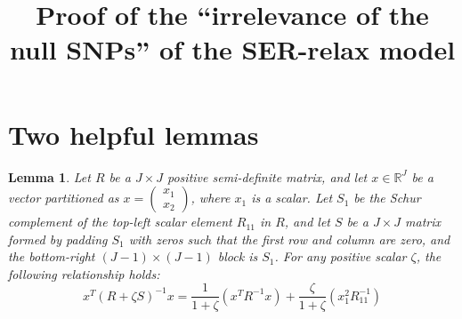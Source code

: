 \documentclass[11pt]{article}
\title{Proof of the ``irrelevance of the null SNPs'' of the SER-relax model}
\author{}
\date{}
\newtheorem{lemma}{Lemma}
\begin{document}
\maketitle

\section{Two helpful lemmas}

\begin{lemma}
Let $R$ be a $J \times J$ positive semi-definite matrix, and let $x \in \mathbb{R}^J$ be a vector partitioned as $x = \begin{pmatrix} x_1 \\ x_2 \end{pmatrix}$, where $x_1$ is a scalar. Let $S_1$ be the Schur complement of the top-left scalar element $R_{11}$ in $R$, and let $S$ be a $J \times J$ matrix formed by padding $S_1$ with zeros such that the first row and column are zero, and the bottom-right $(J-1) \times (J-1)$ block is $S_1$. For any positive scalar $\zeta$, the following relationship holds:
\[
x^T (R + \zeta S)^{-1} x = \frac{1}{1 + \zeta} \left( x^T R^{-1} x \right) + \frac{\zeta}{1 + \zeta} \left( x_1^2 R_{11}^{-1} \right)
\]
\end{lemma}
\end{document}
